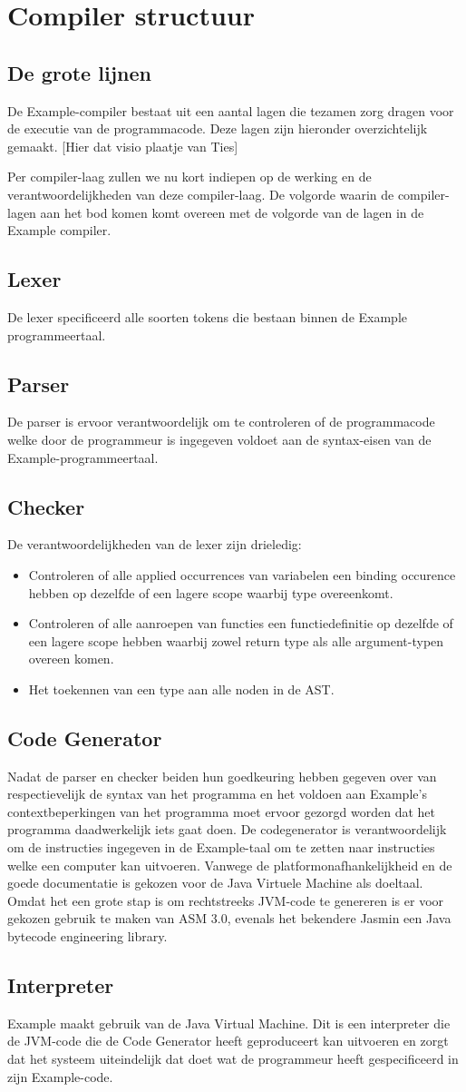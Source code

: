 \chapter{Compiler structuur}
\section{De grote lijnen}
De Example-compiler bestaat uit een aantal lagen die tezamen zorg dragen voor de executie van de programmacode. Deze lagen zijn hieronder overzichtelijk gemaakt. 
[Hier dat visio plaatje van Ties]

Per compiler-laag zullen we nu kort indiepen op de werking en de verantwoordelijkheden van deze compiler-laag. De volgorde waarin de compiler-lagen aan het bod komen komt overeen met de volgorde van de lagen in de Example compiler. 

\section{Lexer}
De lexer specificeerd alle soorten tokens die bestaan binnen de Example programmeertaal.
\section{Parser}
De parser is ervoor verantwoordelijk om te controleren of de programmacode welke door de programmeur is ingegeven voldoet aan de syntax-eisen van de Example-programmeertaal.
\section{Checker}
De verantwoordelijkheden van de lexer zijn drieledig:
\begin{itemize}
	\item Controleren of alle applied occurrences van variabelen een binding occurence hebben op dezelfde of een lagere scope waarbij type overeenkomt.
	\item Controleren of alle aanroepen van functies een functiedefinitie op dezelfde of een lagere scope hebben waarbij zowel return type als alle argument-typen overeen komen.
	\item Het toekennen van een type aan alle noden in de AST.
\end{itemize}
\section{Code Generator}
Nadat de parser en checker beiden hun goedkeuring hebben gegeven over van respectievelijk de syntax van het programma en het voldoen aan Example's contextbeperkingen van het programma moet ervoor gezorgd worden dat het programma daadwerkelijk iets gaat doen. De codegenerator is verantwoordelijk om de instructies ingegeven in de Example-taal om te zetten naar instructies welke een computer kan uitvoeren. Vanwege de platformonafhankelijkheid en de goede documentatie is gekozen voor de Java Virtuele Machine als doeltaal. Omdat het een grote stap is om rechtstreeks JVM-code te genereren is er voor gekozen gebruik te maken van ASM 3.0, evenals het bekendere Jasmin een Java bytecode engineering library. 
\section{Interpreter}
Example maakt gebruik van de Java Virtual Machine. Dit is een interpreter die de JVM-code die de Code Generator heeft geproduceert kan uitvoeren en zorgt dat het systeem uiteindelijk dat doet wat de programmeur heeft gespecificeerd in zijn Example-code. 
